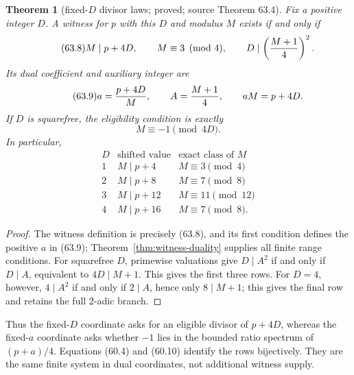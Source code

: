 \documentclass[10pt,reqno]{amsart}
\newtheorem{theorem}{Theorem}[section]
\theoremstyle{definition}
\newcommand{\1}{\mathbf 1}
\begin{document}
\begin{theorem}[fixed-$D$ divisor laws; proved; source Theorem 63.4]
\label{thm:fixed-D-laws}
Fix a positive integer $D$.  A witness for $p$ with this $D$ and modulus
$M$ exists if and only if
\begin{equation}\tag{63.8}
 M\mid p+4D,\qquad M\equiv3\pmod4,
 \qquad D\mid\left({M+1\over4}\right)^2.
\end{equation}
Its dual coefficient and auxiliary integer are
\begin{equation}\tag{63.9}
 a={p+4D\over M},\qquad A={M+1\over4},\qquad aM=p+4D.
\end{equation}
If $D$ is squarefree, the eligibility condition is exactly
\begin{equation}\tag{63.10}
                              M\equiv-1\pmod {4D}.
\end{equation}
In particular,
\begin{equation}\tag{63.11}
\begin{array}{c|c|c}
D&\text{shifted value}&\text{exact class of }M\\ \hline
1&M\mid p+4&M\equiv3\pmod4\\
2&M\mid p+8&M\equiv7\pmod8\\
3&M\mid p+12&M\equiv11\pmod {12}\\
4&M\mid p+16&M\equiv7\pmod8.
\end{array}
\end{equation}
\end{theorem}
\begin{proof}
The witness definition is precisely (63.8), and its first condition
defines the positive $a$ in (63.9);
Theorem~\ref{thm:witness-duality} supplies all finite range conditions.  For
squarefree $D$, primewise valuations give $D\mid A^2$ if and only if
$D\mid A$, equivalent to $4D\mid M+1$.  This gives the first three rows.
For $D=4$, however, $4\mid A^2$ if and only if $2\mid A$, hence only
$8\mid M+1$; this gives the final row and retains the full $2$-adic branch.
\end{proof}
Thus the fixed-$D$ coordinate asks for an eligible divisor of $p+4D$,
whereas the fixed-$a$ coordinate asks whether $-1$ lies in the bounded
ratio spectrum of $(p+a)/4$.  Equations (60.4) and (60.10) identify the
rows bijectively.  They are the same finite system in dual coordinates,
not additional witness supply.
\end{document}
